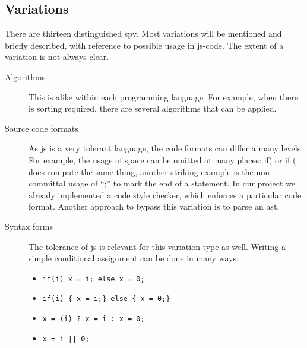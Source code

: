 \subsection{Variations} %
There are thirteen distinguished \gls{spv}. Most variations will be mentioned and
briefly described, with reference to possible usage in \gls{js-code}. 
The extent of a variation is not always clear. 
\begin{description}
  \item[Algorithms] This is alike within each programming language. For example,
  when there is sorting required, there are several algorithms that can be 
  applied.
  \item[Source code formats] As \gls{js} is a very tolerant language, the
  code formats can differ a many levels. For example, the usage of space can be
  omitted at many places: if( or if ( does compute the same thing, another
  striking example is the non-committal usage of ``;'' to mark the end
  of a statement. In our project we already implemented a code style checker, 
  which enforces a particular code format. Another approach to bypass this 
  variation is to parse an \gls{ast}.
  \item[Syntax forms] The tolerance of \gls{js} is relevant for this variation
  type as well. Writing a simple conditional assignment can be done in many 
  ways:
  \begin{itemize}
    \item

\begin{lstlisting}
if(i) x = i; else x = 0;
\end{lstlisting}

    \item

\begin{lstlisting}
if(i) { x = i;} else { x = 0;}
\end{lstlisting}

    \item

\begin{lstlisting}
x = (i) ? x = i : x = 0;
\end{lstlisting}

    \item

\begin{lstlisting}
x = i || 0;
\end{lstlisting}


\end{itemize}
\end{description}
